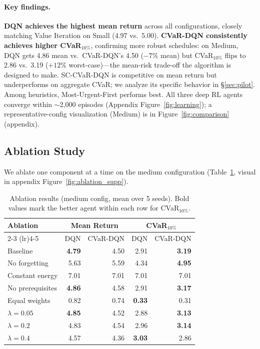 \documentclass[a4paper,11pt]{article}
\theoremstyle{definition}
\begin{document}
\paragraph{Key findings.} \textbf{DQN achieves the highest mean return} across all configurations, closely matching Value Iteration on Small (4.97 vs.\ 5.00). \textbf{CVaR-DQN consistently achieves higher CVaR$_{10\%}$}, confirming more robust schedules: on Medium, DQN gets 4.86 mean vs.\ CVaR-DQN's 4.50 ($-7\%$ mean) but CVaR$_{10\%}$ flips to 2.86 vs.\ 3.19 ($+12\%$ worst-case)---the mean-risk trade-off the algorithm is designed to make. SC-CVaR-DQN is competitive on mean return but underperforms on aggregate CVaR; we analyze its specific behavior in \S\ref{sec:pilot}. Among heuristics, Most-Urgent-First performs best. All three deep RL agents converge within $\sim$2{,}000 episodes (Appendix Figure~\ref{fig:learning}); a representative-config visualization (Medium) is in Figure~\ref{fig:comparison} (appendix).

\subsection{Ablation Study}

We ablate one component at a time on the medium configuration (Table~\ref{tab:ablation}, visual in appendix Figure~\ref{fig:ablation_supp}).

\begin{table}[H]
\centering
\caption{Ablation results (medium config, mean over 5 seeds). Bold values mark the better agent within each row for CVaR$_{10\%}$.}
\label{tab:ablation}
\begin{tabular}{lrrrr}
\toprule
Ablation & \multicolumn{2}{c}{Mean Return} & \multicolumn{2}{c}{CVaR$_{10\%}$} \\
\cmidrule(lr){2-3} \cmidrule(lr){4-5}
         & DQN & CVaR-DQN & DQN & CVaR-DQN \\
\midrule
Baseline          & \textbf{4.79} & 4.50 & 2.91 & \textbf{3.19} \\
No forgetting     & 5.63 & 5.59 & 4.34 & \textbf{4.95} \\
Constant energy   & 7.01 & 7.01 & 7.01 & 7.01 \\
No prerequisites  & \textbf{4.86} & 4.58 & 2.91 & \textbf{3.17} \\
Equal weights     & 0.82 & 0.74 & \textbf{0.33} & 0.31 \\
$\lambda = 0.05$  & \textbf{4.85} & 4.52 & 2.88 & \textbf{3.13} \\
$\lambda = 0.2$   & 4.83 & 4.54 & 2.96 & \textbf{3.14} \\
$\lambda = 0.4$   & 4.57 & 4.36 & \textbf{3.03} & 2.86 \\
\bottomrule
\end{tabular}
\end{table}
\end{document}
